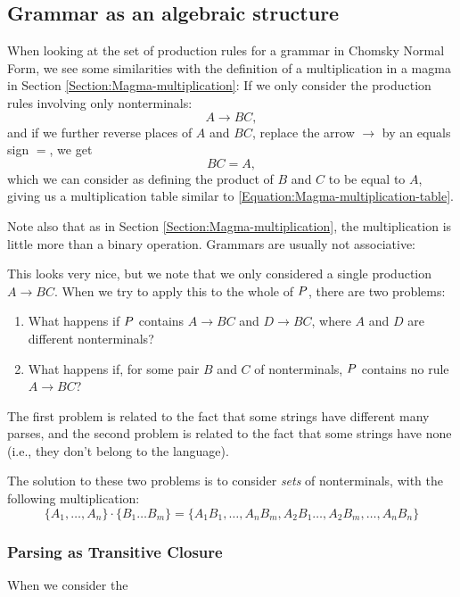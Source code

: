 \subsection{Grammar as an algebraic structure}
When looking at the set of production rules for a grammar in Chomsky Normal Form, we see some similarities with the definition of a multiplication in a magma in Section \ref{Section:Magma-multiplication}:
If we only consider the production rules involving only nonterminals:
\begin{equation*}
  A \to BC,
\end{equation*}
and if we further reverse places of $A$ and $BC$, replace the arrow $\to$ by an equals sign $=$, we get
\begin{equation*}
  BC = A,
\end{equation*}
which we can consider as defining the product of $B$ and $C$ to be equal to $A$, giving us a multiplication table similar to \eqref{Equation:Magma-multiplication-table}.

Note also that as in Section \ref{Section:Magma-multiplication}, the multiplication is little more than a binary operation. Grammars are usually not associative: 

This looks very nice, but we note that we only considered a single production $A \to BC$. When we try to apply this to the whole of $P$, there are two problems:
\begin{enumerate}
\item What happens if $P$ contains $A \to BC$ and $D \to BC$, where $A$ and $D$ are different nonterminals?
\item What happens if, for some pair $B$ and $C$ of nonterminals, $P$ contains no rule $A \to BC$?
\end{enumerate}
The first problem is related to the fact that some strings have different many parses, and the second problem is related to the fact that some strings have none (i.e., they don't belong to the language).

The solution to these two problems is to consider \emph{sets} of nonterminals, with the following multiplication:
\begin{equation*}
  \{A_1, \ldots, A_n \} \cdot \{B_1 \ldots B_m\} = \{A_1B_1, \ldots, A_nB_m, A_2B_1 \ldots, A_2B_m, \ldots, A_nB_n\}
\end{equation*}
\subsubsection{Parsing as Transitive Closure}

When we consider the 


\label{Section:Magma-multiplication}
